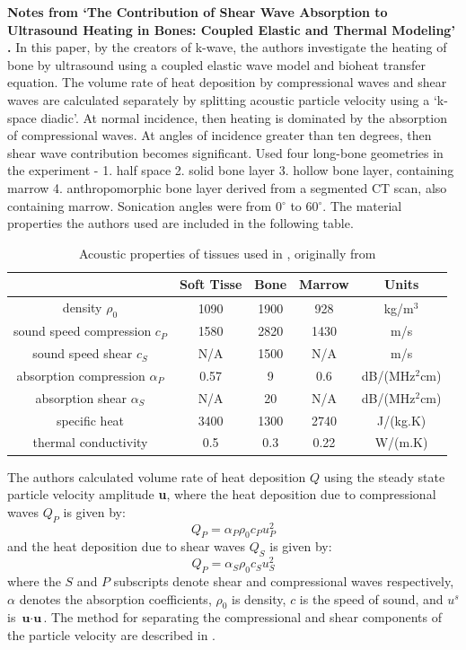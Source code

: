 \documentclass[11pt,titlepage]{article} %
\begin{document}
\textbf{Notes from `The Contribution of Shear Wave Absorption to Ultrasound Heating in Bones: Coupled Elastic and Thermal Modeling' \cite{treeby2015contribution}.}
In this paper, by the creators of k-wave, the authors investigate the heating of bone by ultrasound using a coupled elastic wave model and bioheat transfer equation. The volume rate of heat deposition by compressional waves and shear waves are calculated separately by splitting acoustic particle velocity using a `k-space diadic'. At normal incidence, then heating is dominated by the absorption of compressional waves. At angles of incidence greater than ten degrees, then shear wave contribution becomes significant.
Used four long-bone geometries in the experiment - 1. half space 2. solid bone layer 3. hollow bone layer, containing marrow 4. anthropomorphic bone layer derived from a segmented CT scan, also containing marrow. Sonication angles were from 0$^{\circ}$ to 60$^{\circ}$. The material properties the authors used are included in the following table. 
 \begin{table}[!h]
\begin{center}
  \begin{tabular}{| c | c | c | c | c | }
    \hline
     & Soft Tisse & Bone & Marrow & Units \\ \hline
     density $\rho_0$ & 1090 & 1900 & 928 & kg/m$^3$ \\ 
     sound speed compression $c_P$ & 1580 & 2820 & 1430 & m/s \\ 
     sound speed shear $c_S$ & N/A & 1500 & N/A & m/s \\ 
     absorption compression $\alpha_P$ & 0.57 & 9 & 0.6 & dB/(MHz$^2$cm) \\
     absorption shear $\alpha_S$ & N/A & 20 & N/A & dB/(MHz$^2$cm) \\
	 specific heat & 3400 & 1300 & 2740 & J/(kg.K)\\
	 thermal conductivity & 0.5 & 0.3 & 0.22 & W/(m.K)\\
    \hline
  \end{tabular}
\end{center}
\caption{Acoustic properties of tissues used in \cite{treeby2015contribution}, originally from \cite{duck1990physical}}
\end{table}
\linespread{1.0}
The authors calculated volume rate of heat deposition $Q$ using the steady state particle velocity amplitude \textbf{u}, where the heat deposition due to compressional waves $Q_P$ is given by:
\begin{equation}
Q_P = \alpha_P \rho_0 c_P u_P^2
\end{equation}
and the heat deposition due to shear waves $Q_S$ is given by:
\begin{equation}
Q_P = \alpha_S \rho_0 c_S u_S^2
\end{equation}
where the $S$ and $P$ subscripts denote shear and compressional waves respectively, $\alpha$ denotes the absorption coefficients, $\rho_0$ is density, $c$ is the speed of sound, and $u^s$ is $\textbf{u} \cdot \textbf{u}$. The method for separating the compressional and shear components of the particle velocity are described in \cite{treeby2014modeling}.

\newpage

{}

\end{document}
